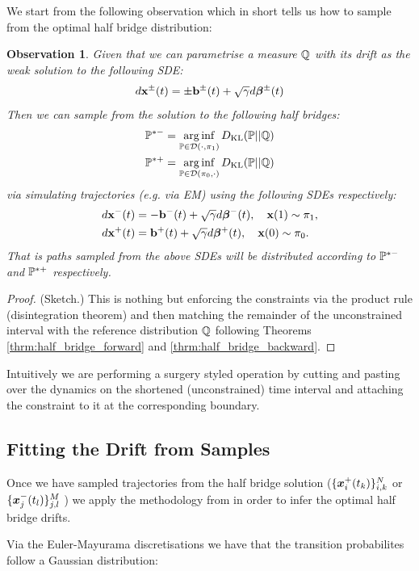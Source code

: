 \documentclass[a4paper,12pt,twoside,openright]{report}
\newtheorem{observation}{Observation}
\theoremstyle{definition}
\begin{document}
We start from the following observation which in short tells us how to sample from the optimal half bridge distribution:
\begin{observation}
Given that we can parametrise a measure $\Q$ with its drift as the weak solution to the following SDE:
\begin{align*}
    d\rvx^{\pm}(t) =  \pm \rvb^{\pm}(t) + \sqrt{\gamma} d \rvw^{\pm}(t) 
\end{align*}
Then we can sample from the solution to the following half bridges:
\begin{align*}
   \P^{*-} = \arginf_{\P \in \calD(\cdot,\pi_1)}\KL(\P || \Q) \\ 
   \P^{*+} = \arginf_{\P \in \calD(\pi_0,\cdot )}\KL(\P || \Q)
\end{align*}
via simulating trajectories (e.g. via EM) using the following SDEs respectively:
\begin{align*}
     d\rvx^{-}(t) &=  - \rvb^{-}(t) + \sqrt{\gamma} d \rvw^{-}(t) , \quad  \rvx(1) \sim \pi_1, \\
     d\rvx^{+}(t) &=  \rvb^{+}(t) + \sqrt{\gamma} d \rvw^{+}(t) , \quad  \rvx(0) \sim \pi_0.
\end{align*}
That is paths sampled from the above SDEs will be distributed according to $\P^{*-}$ and $\P^{*+}$ respectively.
\end{observation}
\begin{proof}(Sketch.) This is nothing but enforcing the constraints via the product rule (disintegration theorem) and then matching the remainder of the unconstrained interval with the reference distribution $\Q$ following Theorems \ref{thrm:half_bridge_forward} and \ref{thrm:half_bridge_backward}.
\end{proof}
Intuitively we are performing a surgery styled operation by cutting and pasting over the dynamics on the shortened (unconstrained) time interval and attaching the constraint to it at the corresponding boundary.
\subsection{Fitting the Drift from Samples}

Once we have sampled trajectories from the half bridge solution ($\{\vx^{+}_i(t_k)\}_{i,k}^N$ or  $\{\vx^{-}_j(t_l)\}_{j,l}^M$ ) we  apply the methodology from \citep{ruttor2013approximate, batz2018approximate} in order to infer the optimal half bridge drifts.



Via the Euler-Mayurama discretisations we have that the transition probabilites follow a Gaussian distribution:
\end{document}
